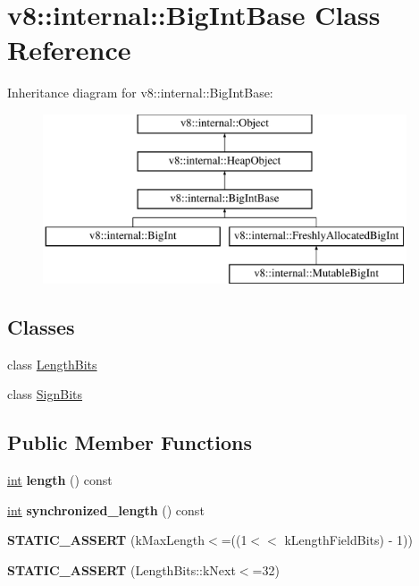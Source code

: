\hypertarget{classv8_1_1internal_1_1BigIntBase}{}\section{v8\+:\+:internal\+:\+:Big\+Int\+Base Class Reference}
\label{classv8_1_1internal_1_1BigIntBase}
Inheritance diagram for v8\+:\+:internal\+:\+:Big\+Int\+Base\+:\begin{figure}[H]
\begin{center}
\leavevmode
\includegraphics[height=5.000000cm]{classv8_1_1internal_1_1BigIntBase}
\end{center}
\end{figure}
\subsection*{Classes}
\begin{DoxyCompactItemize}
\item 
class \mbox{\hyperlink{classv8_1_1internal_1_1BigIntBase_1_1LengthBits}{Length\+Bits}}
\item 
class \mbox{\hyperlink{classv8_1_1internal_1_1BigIntBase_1_1SignBits}{Sign\+Bits}}
\end{DoxyCompactItemize}
\subsection*{Public Member Functions}
\begin{DoxyCompactItemize}
\item 
\mbox{\label{classv8_1_1internal_1_1BigIntBase_a97ca3f51c3cc5f7e4089ce884c4a05cc}} 
\mbox{\hyperlink{classint}{int}} {\bfseries length} () const
\item 
\mbox{\label{classv8_1_1internal_1_1BigIntBase_ae833ffb5b9fad1a8cdb2016c7f594639}} 
\mbox{\hyperlink{classint}{int}} {\bfseries synchronized\+\_\+length} () const
\item 
\mbox{\label{classv8_1_1internal_1_1BigIntBase_a869c82b9f16302637fa02d875c418156}} 
{\bfseries S\+T\+A\+T\+I\+C\+\_\+\+A\+S\+S\+E\+RT} (k\+Max\+Length$<$=((1$<$$<$ k\+Length\+Field\+Bits) -\/ 1))
\item 
\mbox{\label{classv8_1_1internal_1_1BigIntBase_a939866012f3854c76221480a386fec36}} 
{\bfseries S\+T\+A\+T\+I\+C\+\_\+\+A\+S\+S\+E\+RT} (Length\+Bits\+::k\+Next$<$=32)
\end{DoxyCompactItemize}
